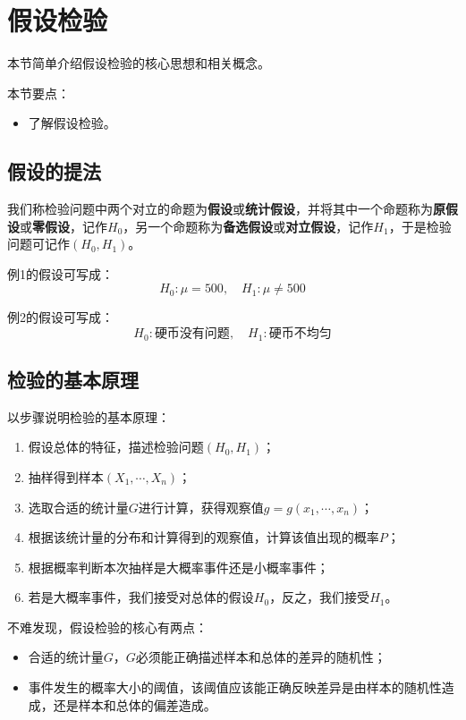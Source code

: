 \section{假设检验}

本节简单介绍假设检验的核心思想和相关概念。

本节要点：
\begin{itemize}
    \item 了解假设检验。
\end{itemize}

\subsection{假设的提法}

\begin{definition}[假设的提法]
我们称检验问题中两个对立的命题为{\bf 假设}或{\bf 统计假设}，并将其中一个命题称为{\bf 原假设}或{\bf 零假设}，记作$H_0$，另一个命题称为{\bf 备选假设}或{\bf 对立假设}，记作$H_1$，于是检验问题可记作$\left( H_0,H_1 \right) $。
\end{definition}

例1的假设可写成：
\[
H_0:\mu =500, \quad H_1:\mu \ne 500
\]

例2的假设可写成：
\[
H_0:\text{硬币没有问题}, \quad H_1:\text{硬币不均匀}
\]

\subsection{检验的基本原理}

以步骤说明检验的基本原理：
\begin{enumerate}
    \item 假设总体的特征，描述检验问题$\left( H_0,H_1 \right) $；
    \item 抽样得到样本$\left( X_1,\cdots ,X_n \right) $；
    \item 选取合适的统计量$G$进行计算，获得观察值$g=g\left( x_1,\cdots ,x_n \right) $；
    \item 根据该统计量的分布和计算得到的观察值，计算该值出现的概率$P$；
    \item 根据概率判断本次抽样是大概率事件还是小概率事件；
    \item 若是大概率事件，我们接受对总体的假设$H_0$，反之，我们接受$H_1$。
\end{enumerate}

不难发现，假设检验的核心有两点：
\begin{itemize}
    \item 合适的统计量$G$，$G$必须能正确描述样本和总体的差异的随机性；
    \item 事件发生的概率大小的阈值，该阈值应该能正确反映差异是由样本的随机性造成，还是样本和总体的偏差造成。
\end{itemize}

